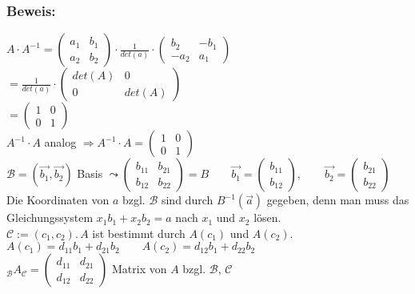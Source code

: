 \subsubsection{Beweis:}
$A\cdot A^{-1} = \begin{pmatrix}a_{1} & b_{1} \\ a_{2} & b_{2} \end{pmatrix} \cdot \frac{1}{det(a)} \cdot \begin{pmatrix} b_{2} & -b_{1} \\ -a_{2} & a_{1} \end{pmatrix}$\\
$ = \frac{1}{det(a)} \cdot \begin{pmatrix} det(A) & 0 \\ 0 & det(A) \end{pmatrix}$\\
$= \begin{pmatrix} 1 & 0 \\ 0 & 1 \end{pmatrix}$\\
$A^{-1}\cdot A$ analog $\Rightarrow A^{-1} \cdot A = \begin{pmatrix} 1 & 0 \\ 0 & 1 \end{pmatrix}$ \\
$\mathcal{B} = (\vec{b_{1}}, \vec{b_{2}})$ Basis $ \leadsto \begin{pmatrix} b_{11} & b_{21} \\ b_{12} & b_{22} \end{pmatrix} = B \qquad \vec{b_{1}} = \begin{pmatrix} b_{11} \\ b_{12} \end{pmatrix}, \qquad \vec{b_{2}}=\begin{pmatrix} b_{21} \\ b_{22} \end{pmatrix}$\\
Die Koordinaten von $a$ bzgl. $\mathcal{B}$ sind durch $B^{-1}(\vec{a})$ gegeben, denn man muss das Gleichungssystem $x_{1}b_{1}+x_{2}b_{2}=a$ nach $x_{1}$ und $x_{2}$ lösen. \\
$\mathcal{C} := ( c_{1}, c_{2}). \, A$ ist bestimmt durch $A(c_{1})$ und $A(c_{2})$. \\
$A(c_{1}) = d_{11}b_{1}+d_{21}b_{2} \qquad A(c_{2})=d_{12}b_{1}+d_{22}b_{2}$\\
$_{\mathcal{B}}A_{\mathcal{C}} = \begin{pmatrix}d_{11} & d_{21} \\ d_{12} & d_{22} \end{pmatrix}$ Matrix von $A$ bzgl. $\mathcal{B},\, \mathcal{C}$\\
%
%
%
